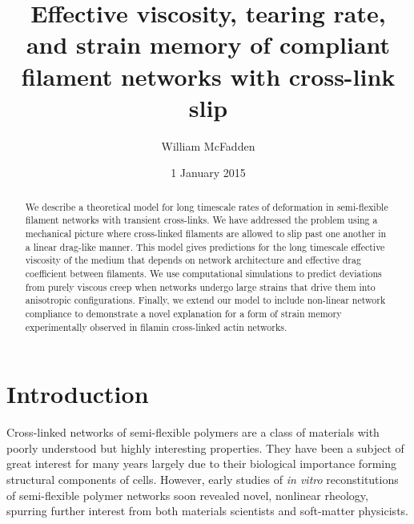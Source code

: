 \documentclass[pre,reprint]{revtex4-1}
\begin{document}
\title{Effective viscosity, tearing rate, and strain memory of compliant filament networks with cross-link slip}
\author{William McFadden}

\date{1 January 2015}

\begin{abstract}
We describe a theoretical model for long timescale rates of deformation in semi-flexible filament networks with transient cross-links.  We have addressed the problem using a mechanical picture where cross-linked filaments are allowed to slip past one another in a linear drag-like manner.  This model gives predictions for the long timescale effective viscosity of the medium that depends on network architecture and effective drag coefficient between filaments.  We use computational simulations to predict deviations from purely viscous creep when networks undergo large strains that drive them into anisotropic configurations.  Finally, we extend our model to include non-linear network compliance to demonstrate a novel explanation for a form of strain memory experimentally observed in filamin cross-linked actin networks.
\end{abstract}

\maketitle


\tableofcontents


















\section{Introduction}

Cross-linked networks of semi-flexible polymers are a class of materials with poorly understood but highly interesting properties.  They have been a subject of great interest for many years largely due to their biological importance forming structural components of cells\cite{cellmech_review1,cellmech_review2}.  However, early studies of {\em in vitro} reconstitutions of semi-flexible polymer networks soon revealed novel, nonlinear rheology, spurring further interest from both materials scientists and soft-matter physicists\cite{megareview}.  
\end{document}
